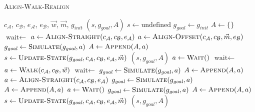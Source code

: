 \begin{algorithm}
	\caption{\scshape Align-Walk-Realign}
	\label{algo:local_algo}
	\begin{algorithmic}[1]
		\REQUIRE $c_\mathcal{A}$, $c_\mathcal{B}$, $e_\mathcal{A}$, $e_\mathcal{B}$, $\vec{w}$, $\vec{m}$, $g_\textit{init}$ 
		\ENSURE $(s, g_\textit{goal}, A)$ 
		\STATE $s \gets \text{undefined}$
		\STATE $g_\textit{goal} \gets g_\textit{init}$
		\STATE $A \gets \{\}$
		\STATE $\text{wait} \gets$ \TRUE
		\LOOP
				\STATE $a \gets \text{\scshape Align-Straight}(c_\mathcal{A}, c_\mathcal{B}, e_\mathcal{A})$
			\ELSE
				\STATE $a \gets \text{\scshape Align-Offset}(c_\mathcal{A}, c_\mathcal{B}, \vec{m}, e_\mathcal{B})$
			\ENDIF
			\STATE $g_\textit{goal} \gets \text{\scshape Simulate}(g_\textit{goal}, a)$
			\STATE $A \gets \text{\scshape Append}(A, a)$
			\STATE $s \gets \text{\scshape Update-State}(g_\textit{goal}, c_\mathcal{A}, c_\mathcal{B}, e_\mathcal{A}, \vec{m})$
				\RETURN $(s, g_\textit{goal}, A)$
			\ENDIF
				\STATE $a \gets \text{\scshape Wait}()$
				\STATE $\text{wait} \gets$ \FALSE
			\ELSE
				\STATE $a \gets \text{\scshape Walk}(c_\mathcal{A}, c_\mathcal{B}, \vec{w})$ 
				\STATE $\text{wait} \gets$ \TRUE
			\ENDIF
			\STATE $g_\textit{goal} \gets \text{\scshape Simulate}(g_\textit{goal}, a)$
			\STATE $A \gets \text{\scshape Append}(A, a)$
				\STATE $a \gets \text{\scshape Align-Straight}(c_\mathcal{A}, c_\mathcal{B}, e_\mathcal{A})$ 
				\STATE $g_\textit{goal} \gets \text{\scshape Simulate}(g_\textit{goal}, a)$
				\STATE $A \gets \text{\scshape Append}(A, a)$
					\STATE $a \gets \text{\scshape Wait}()$
					\STATE $g_\textit{goal} \gets \text{\scshape Simulate}(g_\textit{goal}, a)$
					\STATE $A \gets \text{\scshape Append}(A, a)$
				\ENDWHILE
			\ENDIF
			\STATE $s \gets \text{\scshape Update-State}(g_\textit{goal}, c_\mathcal{A}, c_\mathcal{B}, e_\mathcal{A}, \vec{m})$
				\RETURN $(s, g_\textit{goal}, A)$
			\ENDIF
		\ENDLOOP 
	\end{algorithmic}
\end{algorithm}


